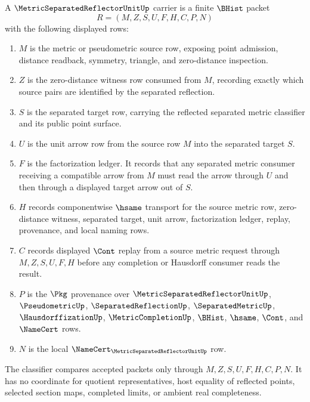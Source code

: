 \begin{definition}
\label{def:metric-separated-reflector-unit-carrier}
A $\MetricSeparatedReflectorUnitUp$ carrier is a finite $\BHist$ packet
$$
R=(M,Z,S,U,F,H,C,P,N)
$$
with the following displayed rows:
\begin{enumerate}
\item $M$ is the metric or pseudometric source row, exposing point admission, distance readback, symmetry, triangle, and zero-distance inspection.
\item $Z$ is the zero-distance witness row consumed from $M$, recording exactly which source pairs are identified by the separated reflection.
\item $S$ is the separated target row, carrying the reflected separated metric classifier and its public point surface.
\item $U$ is the unit arrow row from the source row $M$ into the separated target $S$.
\item $F$ is the factorization ledger. It records that any separated metric consumer receiving a compatible arrow from $M$ must read the arrow through $U$ and then through a displayed target arrow out of $S$.
\item $H$ records componentwise $\hsame$ transport for the source metric row, zero-distance witness, separated target, unit arrow, factorization ledger, replay, provenance, and local naming rows.
\item $C$ records displayed $\Cont$ replay from a source metric request through $M,Z,S,U,F,H$ before any completion or Hausdorff consumer reads the result.
\item $P$ is the $\Pkg$ provenance over $\MetricSeparatedReflectorUnitUp$, $\PseudometricUp$, $\SeparatedReflectionUp$, $\SeparatedMetricUp$, $\HausdorffizationUp$, $\MetricCompletionUp$, $\BHist$, $\hsame$, $\Cont$, and $\NameCert$ rows.
\item $N$ is the local $\NameCert_{\MetricSeparatedReflectorUnitUp}$ row.
\end{enumerate}
The classifier compares accepted packets only through $M,Z,S,U,F,H,C,P,N$. It has no coordinate for quotient representatives, host equality of reflected points, selected section maps, completed limits, or ambient real completeness.
\end{definition}

